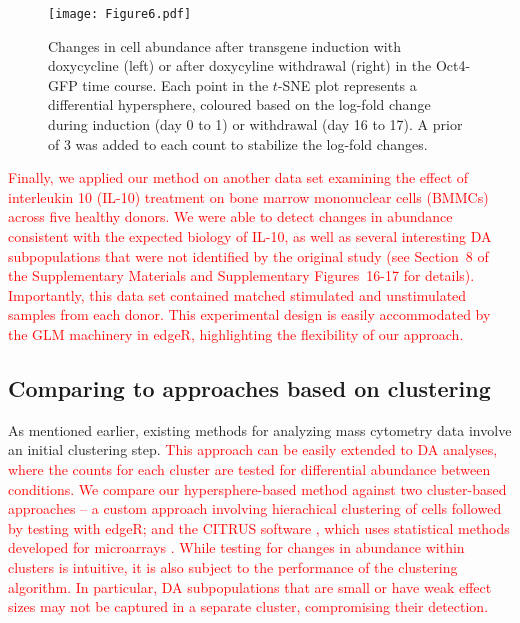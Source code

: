 \documentclass{article}
\newcommand\revised[1]{\textcolor{red}{#1}}
\newcommand{\suppbmmc}{8}
\newcommand{\suppfigbmmc}{16}
\newcommand{\suppfigbmmcmark}{17}
\begin{document}
\begin{figure}[bt]
    \begin{center}
        \texttt{[image: Figure6.pdf]}
    \end{center}
    \caption{
        Changes in cell abundance after transgene induction with doxycycline (left) or after doxycyline withdrawal (right) in the Oct4-GFP time course.
        Each point in the $t$-SNE plot represents a differential hypersphere, coloured based on the log-fold change during induction (day 0 to 1) or withdrawal (day 16 to 17).
        A prior of 3 was added to each count to stabilize the log-fold changes.
    }
    \label{fig:importanttime}
\end{figure}

\revised{Finally, we applied our method on another data set \cite{levine2015datadriven} examining the effect of interleukin 10 (IL-10) treatment on bone marrow mononuclear cells (BMMCs) across five healthy donors.
    We were able to detect changes in abundance consistent with the expected biology of IL-10, as well as several interesting DA subpopulations that were not identified by the original study (see Section~\suppbmmc{} of the Supplementary Materials and Supplementary Figures~\suppfigbmmc{}-\suppfigbmmcmark{} for details).
    Importantly, this data set contained matched stimulated and unstimulated samples from each donor.
    This experimental design is easily accommodated by the GLM machinery in edgeR, highlighting the flexibility of our approach.
}

\subsection{Comparing to approaches based on clustering}
As mentioned earlier, existing methods for analyzing mass cytometry data involve an initial clustering step.
\revised{This approach can be easily extended to DA analyses, where the counts for each cluster are tested for differential abundance between conditions.
We compare our hypersphere-based method against two cluster-based approaches -- a custom approach involving hierachical clustering of cells followed by testing with edgeR; and the CITRUS software \cite{bruggner2014automated}, which uses statistical methods developed for microarrays \cite{tusher2001significance}.
While testing for changes in abundance within clusters is intuitive, it is also subject to the performance of the clustering algorithm.
In particular, DA subpopulations that are small or have weak effect sizes may not be captured in a separate cluster, compromising their detection.
}
\end{document}
